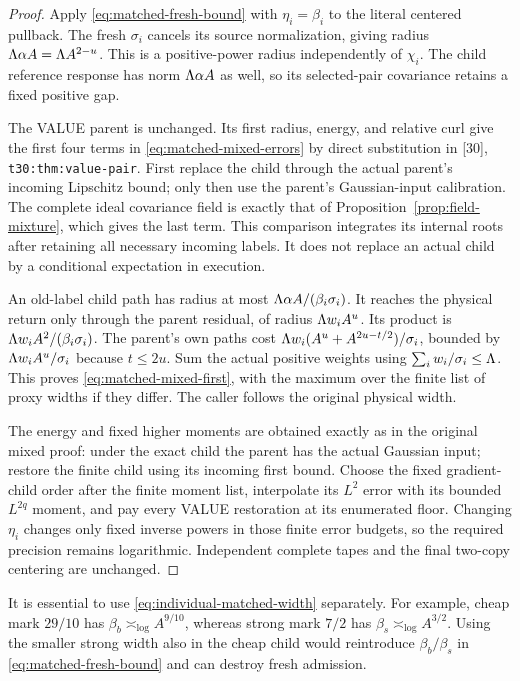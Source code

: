 \documentclass[11pt]{article}
\numberwithin{equation}{section}
\theoremstyle{remark}\newtheorem{remark}[theorem]{Remark}
\newcommand{\src}[1]{\texttt{\nolinkurl{#1}}}
\begin{document}
\begin{proof}
Apply \eqref{eq:matched-fresh-bound} with $\eta_i=\beta_i$ to the
literal centered pullback. The fresh $\sigma_i$ cancels its source
normalization, giving radius $\Lambda\alpha A=\Lambda A^{2-u}$.
This is a positive-power radius independently of $\chi_i$.
The child reference response has norm $\Lambda\alpha A$ as well,
so its selected-pair covariance retains a fixed positive gap.

The VALUE parent is unchanged. Its first radius, energy, and relative
curl give the first four terms in \eqref{eq:matched-mixed-errors}
by direct substitution in [30], \src{t30:thm:value-pair}.
First replace the child through the actual parent's incoming Lipschitz
bound; only then use the parent's Gaussian-input calibration. The
complete ideal covariance field is exactly that of
Proposition~\ref{prop:field-mixture}, which gives the last term.
This comparison integrates its internal roots after retaining all
necessary incoming labels. It does not replace an actual child by
a conditional expectation in execution.

An old-label child path has radius at most
$\Lambda\alpha A/(\beta_i\sigma_i)$. It reaches the physical return
only through the parent residual, of radius $\Lambda w_iA^u$.
Its product is $\Lambda w_iA^2/(\beta_i\sigma_i)$.
The parent's own paths cost
$\Lambda w_i(A^u+A^{2u-t/2})/\sigma_i$, bounded by
$\Lambda w_iA^u/\sigma_i$ because $t\le2u$.
Sum the actual positive weights using
$\sum_iw_i/\sigma_i\le\Lambda$. This proves
\eqref{eq:matched-mixed-first}, with the maximum over the finite
list of proxy widths if they differ. The caller follows the original
physical width. 

The energy and fixed higher moments are obtained exactly as in the
original mixed proof: under the exact child the parent has the actual
Gaussian input; restore the finite child using its incoming first
bound. Choose the fixed gradient-child order after the finite moment
list, interpolate its $L^2$ error with its bounded $L^{2q}$ moment,
and pay every VALUE restoration at its enumerated floor. Changing
$\eta_i$ changes only fixed inverse powers in those finite error
budgets, so the required precision remains logarithmic. Independent
complete tapes and the final two-copy centering are unchanged.
\end{proof}

It is essential to use \eqref{eq:individual-matched-width} separately.
For example, cheap mark $29/10$ has $\beta_b\asymp_{\log}A^{9/10}$,
whereas strong mark $7/2$ has
$\beta_s\asymp_{\log}A^{3/2}$. Using the smaller strong width
also in the cheap child would reintroduce $\beta_b/\beta_s$ in
\eqref{eq:matched-fresh-bound} and can destroy fresh admission.
\end{document}
